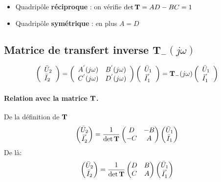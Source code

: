 \begin{itemize}
	\item Quadripôle \textbf{réciproque} : on vérifie $\text{det}\, {\bf T}=AD-BC=1$
	\item Quadripôle \textbf{symétrique} : en plus $A=D$
\end{itemize}



\subsection{Matrice de transfert inverse $\mathbf{T}_-(j\omega)$}%
\[
\left(
\begin{array}{l}
\bar{U}_2\\
\bar{I}_2
\end{array} \right)
= \left(
\begin{array}{cc}
A^{'}(j\omega) & B^{'}(j\omega)\\
C^{'}(j\omega)  &D^{'}(j\omega)
\end{array} \right)\left(
\begin{array}{l}
\bar{U}_1\\
\bar{I}^{'}_1
\end{array} \right)={\bf T}_{-}(j\omega)
\left(
\begin{array}{l}
\bar{U}_1\\
\bar{I}^{'}_1
\end{array} \right)
\]

\begin{center}
\end{center}



\paragraph{Relation avec la matrice ${\bf T}$.}%


De la définition de ${\bf T}$
\[
\begin{pmatrix}
\bar{U}_2\\
\bar{I}_2^{'}
\end{pmatrix} = \frac{1}{\text{det}\, {\bf T}}
\begin{pmatrix}
D & -B\\
-C & A
\end{pmatrix}
\begin{pmatrix}
\bar{U}_1\\\bar{I}_1
\end{pmatrix}\]
De là:
\[
\begin{pmatrix}
\bar{U}_2\\
\bar{I}_2
\end{pmatrix} = \frac{1}{\text{det}\, {\bf T}}
\begin{pmatrix}
D & B\\
C & A
\end{pmatrix}
\begin{pmatrix}
\bar{U}_1\\\bar{I}_1^{'}
\end{pmatrix}\]



